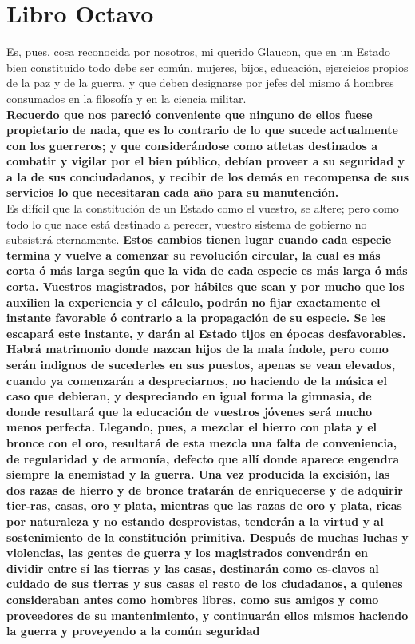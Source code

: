 \documentclass[10pt]{book}
\begin{document}
\chapter*{Libro Octavo}
Es,  pues,  cosa  reconocida  por  nosotros,  mi  querido  Glaucon,  que en un Estado  bien constituido  todo debe ser común,  mujeres,  bijos,  educación,   ejercicios  propios  de  la  paz  y  de la guerra,  y  que  deben  designarse  por jefes del  mismo  á  hombres  consumados  en  la filosofía y  en  la  ciencia  militar. \\
\textbf{Recuerdo que nos  pareció  conveniente  que  ninguno  de  ellos fuese  propietario  de nada,  que  es lo contrario  de  lo que  sucede actualmente  con los guerreros;  y que considerándose  como atletas destinados a combatir y vigilar por el bien público,  debían  proveer  a su  seguridad  y a la  de  sus conciudadanos,  y  recibir  de los  demás  en  recompensa  de  sus  servicios  lo  que  necesitaran  cada  año  para   su   manutención.}\\
Es  difícil que  la  constitución  de  un  Estado  como  el  vuestro,  se  altere;  pero  como  todo   lo  que  nace  está  destinado  a perecer,  vuestro  sistema  de  gobierno  no  subsistirá   eternamente. \textbf{Estos  cambios  tienen  lugar   cuando  cada especie termina y  vuelve  a  comenzar su revolución  circular,  la  cual  es  más  corta  ó  más  larga  según  que la  vida  de  cada  especie  es más larga  ó  más corta.  Vuestros  magistrados,  por hábiles  que sean y por mucho  que los  auxilien  la  experiencia  y  el  cálculo,  podrán  no  fijar  exactamente  el instante  favorable  ó contrario   a  la  propagación  de  su  especie.  Se les escapará  este  instante,  y  darán  al  Estado  tijos  en épocas  desfavorables. Habrá matrimonio donde nazcan hijos de la mala índole, pero  como  serán  indignos  de sucederles  en sus puestos, apenas se vean  elevados,  cuando ya  comenzarán  a  despreciarnos,  no   haciendo  de  la  música  el caso  que  debieran,  y  despreciando  en  igual  forma  la  gimnasia,  de donde resultará  que  la educación de vuestros jóvenes será mucho menos perfecta. Llegando,  pues,  a  mezclar  el  hierro  con  plata   y  el  bronce  con  el  oro,  resultará   de  esta  mezcla  una  falta  de conveniencia,  de regularidad y  de  armonía,  defecto  que  allí  donde  aparece  engendra  siempre  la  enemistad  y la  guerra. Una vez producida la excisión, las dos razas de hierro y  de bronce tratarán  de  enriquecerse  y   de  adquirir  tier-ras,  casas,  oro  y plata,  mientras  que  las  razas   de  oro y plata,  ricas por  naturaleza y no estando desprovistas, tenderán  a  la  virtud  y  al  sostenimiento  de  la   constitución   primitiva. Después  de  muchas  luchas  y   violencias,   las   gentes  de guerra  y  los magistrados  convendrán  en  dividir  entre  sí las tierras  y  las  casas,  destinarán   como  es-clavos  al  cuidado  de  sus tierras  y  sus  casas  el  resto  de  los ciudadanos, a quienes  consideraban  antes  como  hombres libres,  como sus  amigos  y  como  proveedores  de su mantenimiento,  y  continuarán   ellos  mismos haciendo  la  guerra  y  proveyendo  a la  común  seguridad}\\
\end{document}
